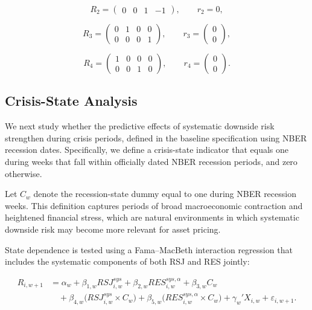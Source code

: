 \documentclass[11pt,a4paper]{article}
\begin{document}
\begin{equation}
R_2 =
\begin{pmatrix}
0 & 0 & 1 & -1
\end{pmatrix},
\qquad
r_2 = 0,
\label{eq:R2}
\end{equation}

\begin{equation}
R_3 =
\begin{pmatrix}
0 & 1 & 0 & 0\\
0 & 0 & 0 & 1
\end{pmatrix},
\qquad
r_3 =
\begin{pmatrix}
0\\
0
\end{pmatrix},
\label{eq:R3}
\end{equation}

\begin{equation}
R_4 =
\begin{pmatrix}
1 & 0 & 0 & 0\\
0 & 0 & 1 & 0
\end{pmatrix},
\qquad
r_4 =
\begin{pmatrix}
0\\
0
\end{pmatrix}.
\label{eq:R4}
\end{equation}


\subsection{Crisis-State Analysis}

We next study whether the predictive effects of systematic downside risk
strengthen during crisis periods, defined in the baseline specification
using NBER recession dates. Specifically, we define a crisis-state
indicator that equals one during weeks that fall within officially dated
NBER recession periods, and zero otherwise.

Let \(C_w\) denote the recession-state dummy equal to one during NBER
recession weeks. This definition captures periods of broad
macroeconomic contraction and heightened financial stress, which are
natural environments in which systematic downside risk may become more
relevant for asset pricing.

State dependence is tested using a Fama--MacBeth interaction regression
that includes the systematic components of both RSJ and RES jointly:

\begin{equation}
\begin{aligned}
R_{i,w+1}
&=
\alpha_w
+
\beta_{1,w} RSJ^{sys}_{i,w}
+
\beta_{2,w} RES^{sys,\alpha}_{i,w}
+
\beta_{3,w} C_w \\
&\quad
+
\beta_{4,w} \bigl(RSJ^{sys}_{i,w}\times C_w\bigr)
+
\beta_{5,w} \bigl(RES^{sys,\alpha}_{i,w}\times C_w\bigr)
+
\gamma_w' X_{i,w}
+
\varepsilon_{i,w+1}.
\end{aligned}
\label{eq:crisis}
\end{equation}
\end{document}
